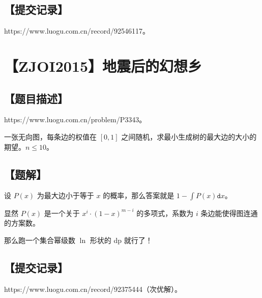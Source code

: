 \documentclass[UTF8,12pt,a4paper]{ctexart}
\begin{document}
	\subsection*{【提交记录】}
	
	https://www.luogu.com.cn/record/92546117。
	
	
	\section*{【ZJOI2015】地震后的幻想乡}
	
	\subsection*{【题目描述】}
	
	https://www.luogu.com.cn/problem/P3343。
	
	一张无向图，每条边的权值在 $[0,1]$ 之间随机，求最小生成树的最大边的大小的期望。$n\le 10$。
	
	\subsection*{【题解】}
	
	设 $P(x)$ 为最大边小于等于 $x$ 的概率，那么答案就是 $1-\int P(x)\texttt{d}x$。
	
	显然 $P(x)$ 是一个关于 $x^i\cdot (1-x)^{m-i}$ 的多项式，系数为 $i$ 条边能使得图连通的方案数。
	
	那么跑一个集合幂级数 $\ln$ 形状的 dp 就行了！
	
	\subsection*{【提交记录】}
	
	https://www.luogu.com.cn/record/92375444（次优解）。
	
\end{document}
